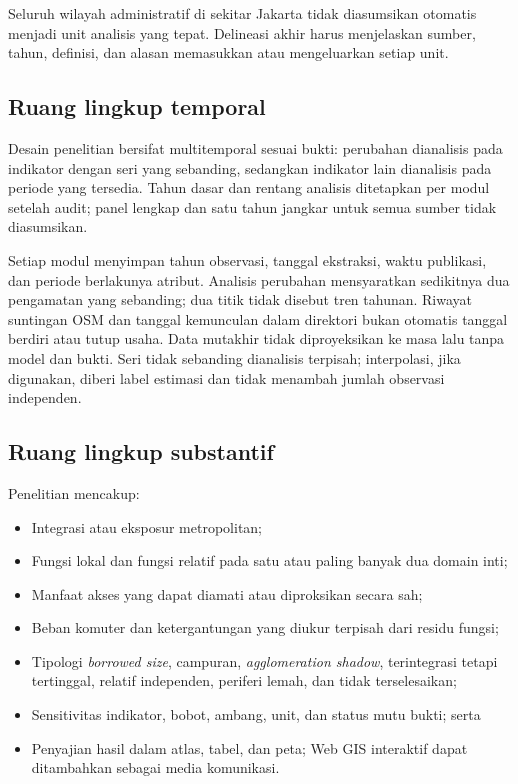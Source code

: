 \documentclass[11pt,a4paper,oneside,openany,indonesian]{report}
\begin{document}
Seluruh wilayah administratif di sekitar Jakarta tidak diasumsikan
otomatis menjadi unit analisis yang tepat. Delineasi akhir harus
menjelaskan sumber, tahun, definisi, dan alasan memasukkan atau
mengeluarkan setiap unit.

\subsection{Ruang lingkup temporal}\label{ruang-lingkup-temporal}

Desain penelitian bersifat multitemporal sesuai bukti: perubahan
dianalisis pada indikator dengan seri yang sebanding, sedangkan
indikator lain dianalisis pada periode yang tersedia. Tahun dasar dan
rentang analisis ditetapkan per modul setelah audit; panel lengkap dan
satu tahun jangkar untuk semua sumber tidak diasumsikan.

Setiap modul menyimpan tahun observasi, tanggal ekstraksi, waktu
publikasi, dan periode berlakunya atribut. Analisis perubahan
mensyaratkan sedikitnya dua pengamatan yang sebanding; dua titik tidak
disebut tren tahunan. Riwayat suntingan OSM dan tanggal kemunculan dalam
direktori bukan otomatis tanggal berdiri atau tutup usaha. Data mutakhir
tidak diproyeksikan ke masa lalu tanpa model dan bukti. Seri tidak
sebanding dianalisis terpisah; interpolasi, jika digunakan, diberi label
estimasi dan tidak menambah jumlah observasi independen.

\subsection{Ruang lingkup
substantif}\label{ruang-lingkup-substantif}

Penelitian mencakup:

\begin{itemize}
\tightlist
\item
  Integrasi atau eksposur metropolitan;
\item
  Fungsi lokal dan fungsi relatif pada satu atau paling banyak dua
  domain inti;
\item
  Manfaat akses yang dapat diamati atau diproksikan secara sah;
\item
  Beban komuter dan ketergantungan yang diukur terpisah dari residu
  fungsi;
\item
  Tipologi \emph{borrowed size}, campuran,
  \emph{agglomeration shadow}, terintegrasi tetapi tertinggal, relatif
  independen, periferi lemah, dan tidak terselesaikan;
\item
  Sensitivitas indikator, bobot, ambang, unit, dan status mutu bukti;
  serta
\item
  Penyajian hasil dalam atlas, tabel, dan peta; Web GIS interaktif dapat
  ditambahkan sebagai media komunikasi.
\end{itemize}
\end{document}
